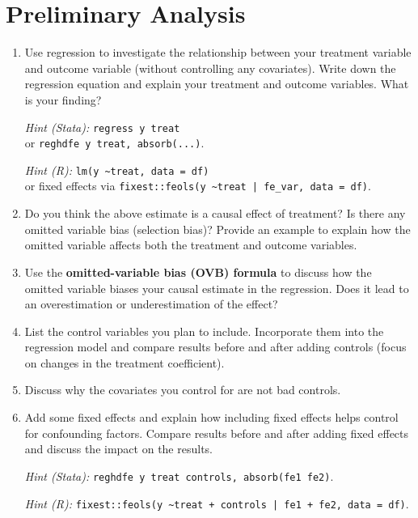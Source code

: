 \documentclass[paper=a4, fontsize=11pt]{scrartcl} %
\begin{document}
\vspace{0.3cm}


\section{Preliminary Analysis}

\begin{enumerate}
\item Use regression to investigate the relationship between your treatment variable and outcome variable (without controlling any covariates). Write down the regression equation and explain your treatment and outcome variables. What is your finding?

\textit{Hint (Stata):} \texttt{regress y treat} \\
or \texttt{reghdfe y treat, absorb(...)}.

\textit{Hint (R):} \texttt{lm(y \textasciitilde treat, data = df)} \\
or fixed effects via \texttt{fixest::feols(y \textasciitilde treat | fe\_var, data = df)}.

\item Do you think the above estimate is a causal effect of treatment? Is there any omitted variable bias (selection bias)? Provide an example to explain how the omitted variable affects both the treatment and outcome variables.

\item Use the \textbf{omitted-variable bias (OVB) formula} to discuss how the omitted variable biases your causal estimate in the regression. Does it lead to an overestimation or underestimation of the effect?

\item List the control variables you plan to include. Incorporate them into the regression model and compare results before and after adding controls (focus on changes in the treatment coefficient).

\item Discuss why the covariates you control for are not bad controls.

\item Add some fixed effects and explain how including fixed effects helps control for confounding factors. Compare results before and after adding fixed effects and discuss the impact on the results.

\textit{Hint (Stata):} \texttt{reghdfe y treat controls, absorb(fe1 fe2)}.

\textit{Hint (R):} \texttt{fixest::feols(y \textasciitilde treat + controls | fe1 + fe2, data = df)}.
\end{enumerate}
\end{document}
